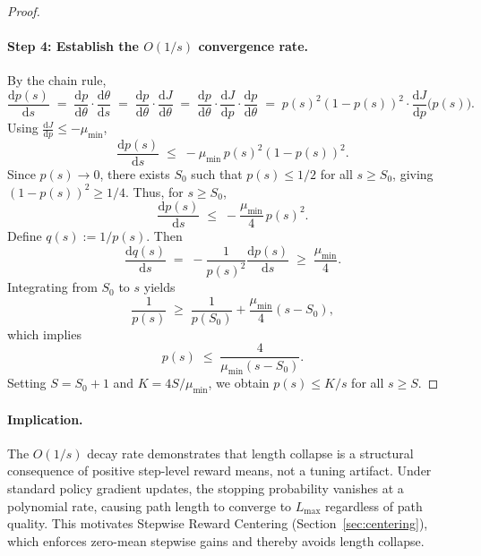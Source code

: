 \documentclass{llmxive}
\begin{document}
\begin{proof}
\paragraph{Step 4: Establish the \texorpdfstring{$O(1/s)$}{O(1/s)} convergence rate.} By the chain rule,
\begin{equation}
    \frac{\mathrm{d}p(s)}{\mathrm{d}s}
    \;=\; \frac{\mathrm{d}p}{\mathrm{d}\theta}\cdot \frac{\mathrm{d}\theta}{\mathrm{d}s}
    \;=\; \frac{\mathrm{d}p}{\mathrm{d}\theta}\cdot \frac{\mathrm{d}J}{\mathrm{d}\theta}
    \;=\; \frac{\mathrm{d}p}{\mathrm{d}\theta}\cdot \frac{\mathrm{d}J}{\mathrm{d}p}\cdot \frac{\mathrm{d}p}{\mathrm{d}\theta}
    \;=\; p(s)^2(1-p(s))^2\cdot \frac{\mathrm{d}J}{\mathrm{d}p}\bigl(p(s)\bigr).
\end{equation}
Using $\frac{\mathrm{d}J}{\mathrm{d}p} \leq -\mu_{\min}$,
\begin{equation}
    \frac{\mathrm{d}p(s)}{\mathrm{d}s}
    \;\leq\; -\mu_{\min}\, p(s)^2(1-p(s))^2.
\end{equation}
Since $p(s) \to 0$, there exists $S_0$ such that $p(s) \leq 1/2$ for all $s \geq S_0$, giving $(1-p(s))^2 \geq 1/4$. Thus, for $s \geq S_0$,
\begin{equation}
    \frac{\mathrm{d}p(s)}{\mathrm{d}s}
    \;\leq\; -\frac{\mu_{\min}}{4}\, p(s)^2.
\end{equation}
Define $q(s):=1/p(s)$. Then
\begin{equation}
    \frac{\mathrm{d}q(s)}{\mathrm{d}s}
    \;=\; -\frac{1}{p(s)^2}\frac{\mathrm{d}p(s)}{\mathrm{d}s}
    \;\geq\; \frac{\mu_{\min}}{4}.
\end{equation}
Integrating from $S_0$ to $s$ yields
\begin{equation}
    \frac{1}{p(s)} \;\geq\; \frac{1}{p(S_0)} + \frac{\mu_{\min}}{4}(s - S_0),
\end{equation}
which implies
\begin{equation}
    p(s) \;\leq\; \frac{4}{\mu_{\min}(s - S_0)}.
\end{equation}
Setting $S = S_0 + 1$ and $K = 4S/\mu_{\min}$, we obtain $p(s) \leq K/s$ for all $s \geq S$.
\end{proof}

\paragraph{Implication.} The $O(1/s)$ decay rate demonstrates that length collapse is a structural consequence of positive step-level reward means, not a tuning artifact. Under standard policy gradient updates, the stopping probability vanishes at a polynomial rate, causing path length to converge to $L_{\max}$ regardless of path quality. This motivates Stepwise Reward Centering (Section~\ref{sec:centering}), which enforces zero-mean stepwise gains and thereby avoids length collapse.
\end{document}
